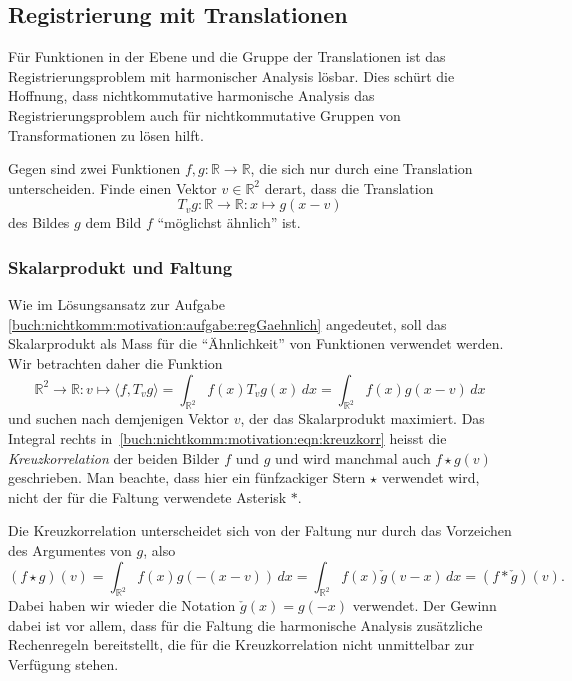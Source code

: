 %
%
\subsection{Registrierung mit Translationen
\label{buch:nichtkomm:motivation:subsection:translationen}}
Für Funktionen in der Ebene und die Gruppe der Translationen
ist das Registrierungsproblem mit harmonischer Analysis lösbar.
Dies schürt die Hoffnung, dass nichtkommutative harmonische
Analysis das Registrierungsproblem auch für nichtkommutative
Gruppen von Transformationen zu lösen hilft.

\begin{aufgabe}
\label{buch:nichtkomm:motivation:aufgabe:r2}
Gegen sind zwei Funktionen $f, g\colon\mathbb{R}\to\mathbb{R}$, die
sich nur durch eine Translation unterscheiden.
Finde einen Vektor $v\in\mathbb{R}^2$ derart, dass die Translation
\[
T_vg
\colon
\mathbb{R}\to \mathbb{R}
:
x\mapsto g(x-v)
\]
des Bildes $g$ dem Bild $f$ ``möglichst ähnlich'' ist.
\end{aufgabe}

%
%
\subsubsection{Skalarprodukt und Faltung}
Wie im Lösungsansatz zur Aufgabe
\ref{buch:nichtkomm:motivation:aufgabe:regGaehnlich}
angedeutet, soll das Skalarprodukt als Mass für die ``Ähnlichkeit''
von Funktionen verwendet werden.
Wir betrachten daher die Funktion
\begin{equation}
\mathbb{R}^2 \to \mathbb{R}
:
v\mapsto \langle f,T_vg\rangle
=
\int_{\mathbb{R}^2} f(x)T_vg(x)\,dx
=
\int_{\mathbb{R}^2} f(x)g(x-v)\,dx
\label{buch:nichtkomm:motivation:eqn:kreuzkorr}
\end{equation}
und suchen nach demjenigen Vektor $v$, der das Skalarprodukt
maximiert.
Das Integral rechts in~\eqref{buch:nichtkomm:motivation:eqn:kreuzkorr}
heisst die {\em Kreuzkorrelation} der beiden Bilder $f$ und $g$ und
wird manchmal auch $f\star g(v)$ geschrieben.
Man beachte, dass hier ein fünfzackiger Stern $\star$ verwendet wird,
nicht der für die Faltung verwendete Asterisk $*$.

Die Kreuzkorrelation unterscheidet sich von der Faltung nur durch
das Vorzeichen des Argumentes von $g$, also
\begin{equation}
(f\star g)(v)
=
\int_{\mathbb{R}^2} f(x) g(-(x-v))\,dx
=
\int_{\mathbb{R}^2} f(x) \check{g}(v-x)\,dx
=
(f *\check{g}) (v).
\label{buch:nichtkomm:motivation:eqn:kkorrfaltung}
\end{equation}
Dabei haben wir wieder die Notation $\check{g}(x)=g(-x)$ verwendet.
Der Gewinn dabei ist vor allem, dass für die Faltung die harmonische
Analysis zusätzliche Rechenregeln bereitstellt, die für die
Kreuzkorrelation nicht unmittelbar zur Verfügung stehen.

